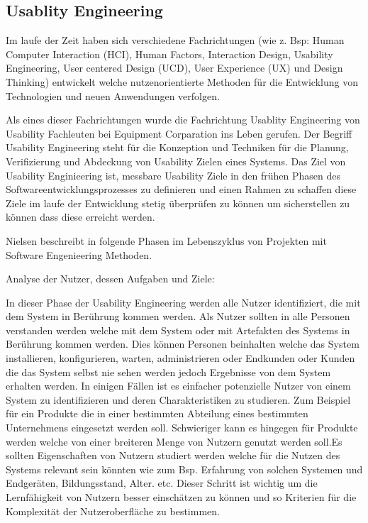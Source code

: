 
\subsection{Usablity Engineering}

\cite{MichaelRichter2016} Im laufe der Zeit haben sich verschiedene Fachrichtungen (wie z. Bsp: Human Computer Interaction (HCI), Human Factors, Interaction Design, Usability Engineering, 
User centered Design (UCD), User Experience (UX) und Design Thinking)  entwickelt welche nutzenorientierte Methoden für die Entwicklung von Technologien und neuen Anwendungen verfolgen. 

\cite{MaryBethRossonJohnM.CarrollDianeD.Cerra2002} Als eines dieser Fachrichtungen wurde die Fachrichtung Usablity Engineering von Usability Fachleuten bei Equipment Corparation ins Leben gerufen.  
Der Begriff Usability Engineering steht für die Konzeption und Techniken für die Planung, Verifizierung und Abdeckung von Usability Zielen eines Systems. Das Ziel von Usability Enginieering ist, 
messbare Usability Ziele in den frühen Phasen des Softwareentwicklungsprozesses zu definieren und einen Rahmen zu schaffen diese Ziele im laufe der Entwicklung stetig überprüfen zu können 
um sicherstellen zu können dass diese erreicht werden.

Nielsen beschreibt in \cite{Nielsen1994} folgende Phasen im Lebenszyklus von Projekten mit Software Engenieering Methoden.

Analyse der Nutzer, dessen Aufgaben und Ziele:  

In dieser Phase der Usability Engineering werden alle Nutzer identifiziert, die mit dem System in Berührung kommen werden. Als Nutzer sollten in alle Personen verstanden werden welche mit dem 
System oder mit Artefakten des Systems in Berührung kommen werden. Dies können Personen beinhalten welche das System installieren, konfigurieren, warten, administrieren oder Endkunden oder 
Kunden die das System selbst nie sehen werden jedoch Ergebnisse von dem System erhalten werden.  In einigen Fällen ist es einfacher potenzielle Nutzer von einem System zu identifizieren und deren 
Charakteristiken zu studieren. Zum Beispiel für ein Produkte die in einer bestimmten Abteilung eines bestimmten Unternehmens eingesetzt werden soll. Schwieriger kann es hingegen für Produkte werden 
welche von einer breiteren Menge von Nutzern genutzt werden soll.Es sollten Eigenschaften von Nutzern studiert werden welche für die Nutzen des Systems relevant sein könnten wie zum Bsp. 
Erfahrung von solchen Systemen und Endgeräten, Bildungsstand, Alter. etc. Dieser Schritt ist wichtig um die Lernfähigkeit von Nutzern besser einschätzen zu können und so Kriterien für die Komplexität der 
Nutzeroberfläche zu bestimmen.

